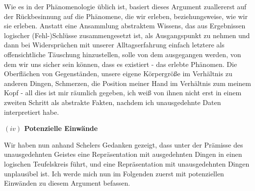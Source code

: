 \documentclass[a4paper, 12pt]{article}
\begin{document}
\begin{onehalfspace}

Wie es in der Phänomenologie üblich ist, basiert dieses Argument zuallererst auf der Rück\-be\-sinnung auf die Phänomene, die wir erleben, beziehungsweise, wie wir sie erleben. Anstatt eine Ansammlung abstraktem Wissens, das aus Ergebnissen logischer (Fehl-)Schlüsse zusammengesetzt ist, als Ausgangspunkt zu nehmen und dann bei Widersprüchen mit unserer Alltagserfahrung einfach letztere als offensichtliche Täuschung hinzustellen, solle von dem ausgegangen werden, von dem wir uns sicher sein können, dass es existiert - das erlebte Phänomen. Die Oberflächen von Gegenständen, unsere eigene Körpergröße im Verhältnis zu anderen Dingen, Schmerzen, die Position meiner Hand im Verhältnis zum meinem Kopf - all dies ist mir räumlich gegeben, ich weiß von ihnen nicht erst in einem zweiten Schritt als abstrakte Fakten, nachdem ich unausgedehnte Daten interpretiert habe.

\vspace{5mm}
\noindent\textbf{$(iv)$ Potenzielle Einwände} 


\noindent Wir haben nun anhand Schelers Gedanken gezeigt, dass unter der Prämisse des unausgedehnten Geistes eine Repräsentation mit ausgedehnten Dingen in einen logischen Teufelskreis führt, und eine Repräsentation mit unausgedehnten Dingen unplausibel ist. Ich werde mich nun im Folgenden zuerst mit potenziellen Einwänden zu diesem Argument befassen.



\end{onehalfspace}
\end{document}

